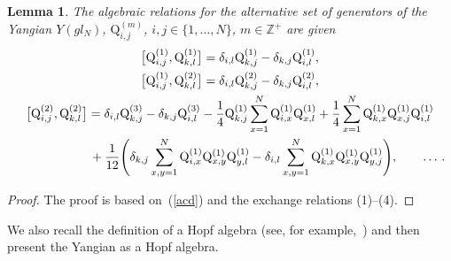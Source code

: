\documentclass[10pt,a4paper]{amsart}
\numberwithin{equation}{section}
\newtheorem{lem}[thm]{Lemma}
\theoremstyle{definition}
\def\mathfrak#1{#1}%
\def\mathcal#1{#1}%
\begin{document}
\begin{lem}\label{lemmaq}
The algebraic relations for the alternative set of generators of the Yangian ${\mathcal Y}(\mathfrak{gl}_{\mathcal N})$,
${\mathrm Q}_{i,j}^{(m)}$, $i,j \in \{1, \dots, {\mathcal N} \}$, $m \in {\mathbb Z}^+$ are given
\begin{gather*}
\bigl[ {\mathrm Q}_{i,j}^{(1)}, {\mathrm Q}_{k,l}^{(1)} \bigr] =\delta_{i,l}{\mathrm Q}^{(1)}_{k,j}- \delta_{k,j}{\mathrm Q}^{(1)}_{i,l},\\
 \bigl[ {\mathrm Q}_{i,j}^{(1)}, {\mathrm Q}_{k,l}^{(2)} \bigr] =\delta_{i,l}{\mathrm Q}^{(2)}_{k,j}-\delta_{k,j}
{\mathrm Q}^{(2)}_{i,l},\\
\bigl[ {\mathrm Q}_{i,j}^{(2)}, {\mathrm Q}_{k,l}^{(2)} \bigr]
= \delta_{i,l}{\mathrm Q}^{(3)}_{k,j}- \delta_{k,j}{\mathrm Q}^{(3)}_{i,l}
-\frac{1}{4}{\mathrm Q}_{k,j}^{(1)}\sum_{x=1}^{\mathcal N} {\mathrm
Q}_{i,x}^{(1)}{\mathrm Q}_{x,l}^{(1)}+ \frac{1}{4}\sum_{x=1}^{\mathcal N}{\mathrm Q}_{k,x}^{(1)}{\mathrm Q}_{x,j}^{(1)}
{\mathrm Q}_{i,l}^{(1)}
\\
\hphantom{\bigl[ {\mathrm Q}_{i,j}^{(2)}, {\mathrm Q}_{k,l}^{(2)} \bigr]=}{}
 + \frac{1}{12} \Biggl( \delta_{k,j} \sum_{x,y=1}^{\mathcal N}{\mathrm Q}_{i,x}^{(1)}{\mathrm Q}_{x,y}^{(1)}
{\mathrm Q}_{y,l}^{(1)} - \delta_{i,l} \sum_{x,y=1}^{\mathcal N}{\mathrm Q}_{k,x}^{(1)} {\mathrm Q}_{x,y}^{(1)}
{\mathrm Q}_{y,j}^{(1)}\Biggr), \qquad \dots\,. %
\end{gather*}
\end{lem}
\begin{proof}
The proof is based on~(\ref{acd}) and the exchange relations (1)--(4).
\end{proof}

We also recall the definition of a Hopf algebra (see, for example,~\cite{Chari, Majid}) and then present the Yangian as a Hopf algebra.
\end{document}

